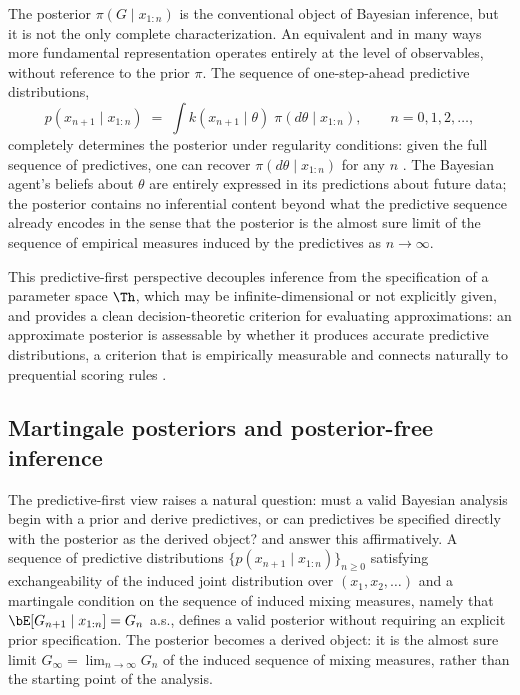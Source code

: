 The posterior $\pi(G \mid x_{1:n})$ is the conventional object of Bayesian
inference, but it is not the only complete characterization.  An equivalent
and in many ways more fundamental representation operates entirely at the
level of observables, without reference to the prior $\pi$. The
sequence of one-step-ahead predictive distributions,
\begin{equation}
  p(x_{n+1} \mid x_{1:n})
  \;=\;
  \int k(x_{n+1} \mid \theta)\;
  \pi(d\theta \mid x_{1:n}),
  \qquad n = 0, 1, 2, \ldots,
  \label{eq:predictive}
\end{equation}
completely determines the posterior under regularity conditions: given the
full sequence of predictives, one can recover $\pi(d\theta \mid x_{1:n})$ for
any $n$ \citep[Theorem~1]{FongHolmesWalker2023}.   The
Bayesian agent's beliefs about $\theta$ are entirely expressed in its
predictions about future data; the posterior contains no inferential
content beyond what the predictive sequence already encodes in the sense
that the posterior is the almost sure limit of the sequence of empirical
measures induced by the predictives as $n \to \infty$.

This predictive-first perspective decouples inference from the
specification of a parameter space $\Th$, which may be
infinite-dimensional or not explicitly given, and provides a clean
decision-theoretic criterion for evaluating approximations: an approximate
posterior is assessable by whether it produces accurate predictive
distributions, a criterion that is empirically measurable and connects
naturally to prequential scoring rules \citep{Dawid1984}.

\subsection{Martingale posteriors and posterior-free inference}
\label{subsec:intro:martingale}

The predictive-first view raises a natural question: must a valid Bayesian
analysis begin with a prior and derive predictives, or can predictives be
specified directly with the posterior as the derived object?
\citet{FongHolmesWalker2020} and \citet{WalkerHolmes2024} answer this
affirmatively.  A sequence of predictive distributions
$\{p(x_{n+1} \mid x_{1:n})\}_{n \geq 0}$ satisfying exchangeability of
the induced joint distribution over $(x_1, x_2, \ldots)$ and a martingale
condition on the sequence of induced mixing measures, namely that
$\bE[G_{n+1} \mid x_{1:n}] = G_n$ a.s., defines a valid
posterior without requiring an explicit prior specification.  The posterior
becomes a derived object: it is the almost sure limit $G_\infty =
\lim_{n\to\infty} G_n$ of the induced sequence of mixing measures, rather
than the starting point of the analysis.

